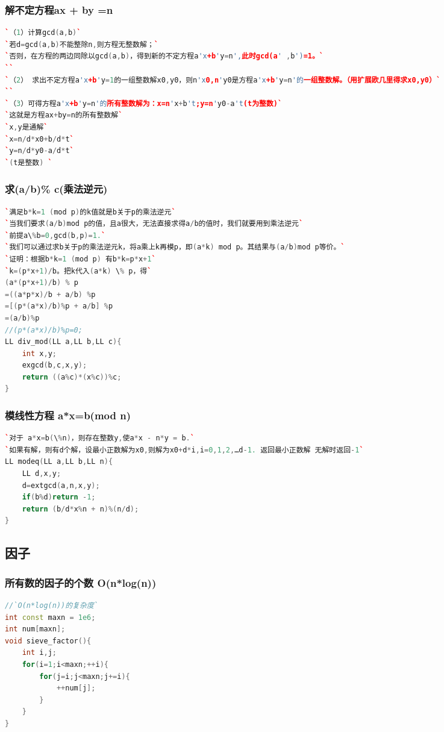 \documentclass[a4paper]{article}
\begin{document}
\begin{CJK*}{UTF8}{gbsn}
\begin{multicols}{3}
\begin{flushleft}
\subsubsection{解不定方程ax + by =n}
\begin{lstlisting}[language={c++}]
`（1）计算gcd(a,b)`
`若d=gcd(a,b)不能整除n,则方程无整数解；`
`否则，在方程的两边同除以gcd(a,b)，得到新的不定方程a'x+b'y=n',此时gcd(a' ,b')=1。`
``
`（2） 求出不定方程a'x+b'y=1的一组整数解x0,y0，则n'x0,n'y0是方程a'x+b'y=n'的一组整数解。（用扩展欧几里得求x0,y0）`
``
`（3）可得方程a'x+b'y=n'的所有整数解为：x=n'x+b't;y=n'y0-a't(t为整数)`
`这就是方程ax+by=n的所有整数解`
`x,y是通解`
`x=n/d*x0+b/d*t`
`y=n/d*y0-a/d*t`
`(t是整数) `
\end{lstlisting}



\subsubsection{求(a/b)\% c(乘法逆元)}
\begin{lstlisting}[language={c++}]
`满足b*k=1 (mod p)的k值就是b关于p的乘法逆元`
`当我们要求(a/b)mod p的值，且a很大，无法直接求得a/b的值时，我们就要用到乘法逆元`
`前提a\%b=0,gcd(b,p)=1.`
`我们可以通过求b关于p的乘法逆元k，将a乘上k再模p，即(a*k) mod p。其结果与(a/b)mod p等价。`
`证明：根据b*k=1 (mod p) 有b*k=p*x+1`
`k=(p*x+1)/b。把k代入(a*k) \% p，得`
(a*(p*x+1)/b) % p
=((a*p*x)/b + a/b) %p
=[(p*(a*x)/b)%p + a/b] %p
=(a/b)%p
//(p*(a*x)/b)%p=0;
LL div_mod(LL a,LL b,LL c){
	int x,y;
	exgcd(b,c,x,y);
	return ((a%c)*(x%c))%c; 
} 
\end{lstlisting}




\subsubsection{模线性方程 a*x=b(mod n)}
\begin{lstlisting}[language={c++}]
`对于 a*x=b(\%n)，则存在整数y,使a*x - n*y = b.`
`如果有解，则有d个解，设最小正数解为x0,则解为x0+d*i,i=0,1,2,…d-1. 返回最小正数解 无解时返回-1`
LL modeq(LL a,LL b,LL n){
	LL d,x,y;
	d=extgcd(a,n,x,y);
	if(b%d)return -1;
	return (b/d*x%n + n)%(n/d);
}
\end{lstlisting}


\subsection{因子}
\subsubsection{所有数的因子的个数 O(n*log(n))}
\begin{lstlisting}[language={c++}]
//`O(n*log(n))的复杂度`
int const maxn = 1e6;
int num[maxn];
void sieve_factor(){
    int i,j;
    for(i=1;i<maxn;++i){
        for(j=i;j<maxn;j+=i){
            ++num[j];
        }
    }
}
\end{lstlisting}



\end{flushleft}
\end{multicols}
\end{CJK*}
\end{document}
